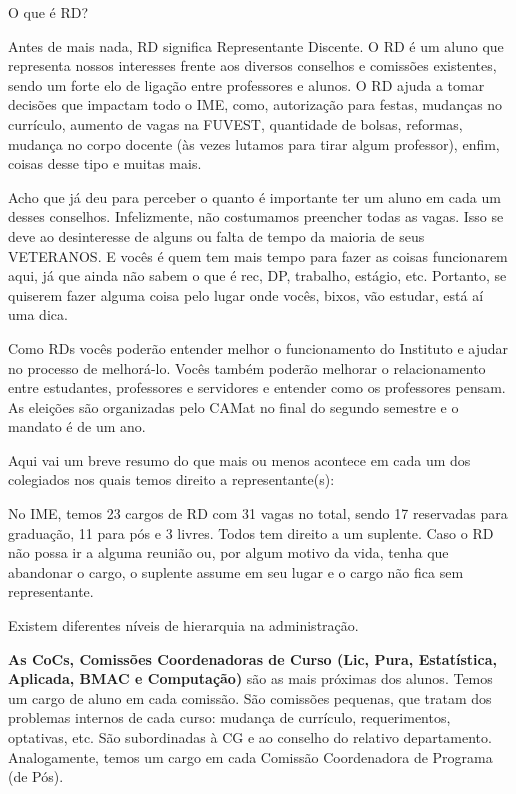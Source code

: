 \begin{secao}{O que é RD?}

Antes de mais nada, RD significa Representante Discente. O RD é um aluno que
representa nossos interesses frente aos diversos conselhos e comissões
existentes, sendo um forte elo de ligação entre professores e alunos. O RD
ajuda a tomar decisões que impactam todo o IME, como, autorização para festas,
mudanças no currículo, aumento de vagas na FUVEST, quantidade de bolsas,
reformas, mudança no corpo docente (às vezes lutamos para tirar algum
professor), enfim, coisas desse tipo e muitas mais.

Acho que já deu para perceber o quanto é importante ter um aluno em cada um
desses conselhos. Infelizmente, não costumamos preencher todas as vagas. Isso se
deve ao desinteresse de alguns ou falta de tempo da maioria de seus VETERANOS.
E vocês é quem tem mais tempo para fazer as coisas funcionarem aqui, já que
ainda não sabem o que é rec, DP, trabalho, estágio, etc. Portanto, se quiserem
fazer alguma coisa pelo lugar onde vocês, bixos, vão estudar, está aí
uma dica.

Como RDs vocês poderão entender melhor o funcionamento do Instituto e ajudar no
processo de melhorá-lo. Vocês também poderão melhorar o relacionamento entre
estudantes, professores e servidores e entender como os professores pensam.
As eleições são organizadas pelo CAMat no final do segundo semestre e o
mandato é de um ano.

Aqui vai um breve resumo do que mais ou menos acontece em cada um dos colegiados
nos quais temos direito a representante(s):

No IME, temos 23 cargos de RD com 31 vagas no total, sendo 17 reservadas
para graduação, 11 para pós e 3 livres. Todos tem direito a um suplente.
Caso o RD não possa ir a alguma reunião ou, por algum motivo da vida, tenha
que abandonar o cargo, o suplente assume em seu lugar e o cargo não fica
sem representante.

Existem diferentes níveis de hierarquia na administração.

{\bf As CoCs,
Comissões Coordenadoras de Curso (Lic, Pura, Estatística, Aplicada, BMAC e
Computação)} são as mais próximas dos alunos. Temos um cargo de aluno em cada
comissão. São comissões pequenas, que tratam dos problemas internos de cada
curso: mudança de currículo, requerimentos, optativas, etc. São subordinadas
à CG e ao conselho do relativo departamento. Analogamente, temos um cargo em cada
Comissão Coordenadora de Programa (de Pós).


\end{secao}
